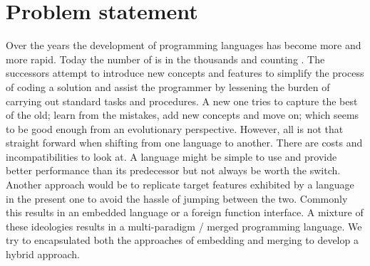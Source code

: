 \documentclass[thesis-solanki.tex]{subfiles}
\begin{document}
\section{Problem statement}

Over the years the development of programming languages has become more and more rapid.
Today the number of is in the thousands and counting \cite{website:timelineproglangwiki,
  website:historyofproglang}.
The successors attempt to introduce new concepts and features to simplify the process of coding a solution and
assist the programmer by lessening the burden of carrying out standard tasks and procedures.
A new one tries to capture the best of the old; learn from the mistakes, add new concepts and move on; which seems
to be good enough from an evolutionary perspective.
However, all is not that straight forward when shifting from one language to another.
There are costs and incompatibilities to look at.
A language might be simple to use and provide better performance than its predecessor but not always be worth the
switch.
Another approach would be to replicate target features exhibited by a language in the present one to avoid the
hassle of jumping between the two.
Commonly this results in an embedded language or a foreign function interface.
A mixture of these ideologies results in a multi-paradigm / merged programming language.
We try to encapsulated both the approaches of embedding and merging to develop a hybrid approach.


\begin{comment}
\progLang{Prolog} has a similar story. It was born in an era where procedural programming had made everyone notice their presence. Talking about
competition, it was against something radical; the \progLang{C} programming language. The languages \progLang{C} has influenced is off the chart and
so is the performance. It had paved the way for structured procedural programming and had given birth to the Unix operating system. Though the
original version of \progLang{Prolog} has given rise to a large number of different flavours but a few drawbacks remain through the bloodline and as a
result it did become the first choice. Some basic requirements such as modules are not provided by all compilers. To make it do real world stuff, a set of
practical features are pushed in now and then which results in the loss of the purely declarative charm. The problem is that \progLang{Prolog} is fading
away, \cite{website:prolog-steam,website:prolog-death,website:prolog-killer}, not many people use it and most of the times when it is used, the variant
is usually \textit{practical} \progLang{Prolog} and the area being academia. It is not used for building large programs \cite{wikiprolog,somogyi1995
logic,website:prolog1000db}. But\butbut{} there are a lot of good things about \progLang{Prolog} that should not die away. Moreover, \progLang{Prolog} is ideal
for search problems.
\end{comment}
\end{document}
